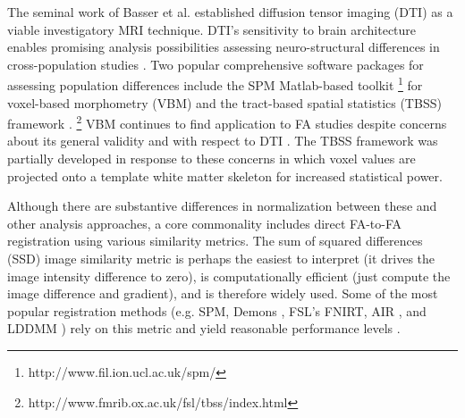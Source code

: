 \documentclass[final,5p,times,twocolumn]{elsarticle}
\begin{document}

The seminal work of Basser et al. \citep{Basser1994a,Basser1994} established diffusion tensor imaging (DTI) as a viable investigatory MRI technique.  DTI's sensitivity to brain architecture \citep{Basser1996,Assaf2008} enables promising analysis possibilities assessing neuro-structural differences in cross-population studies \citep{Kubicki2005,Arnone2008,Kantarci2010,Rametti2010}.
Two popular comprehensive software packages for assessing population differences include the SPM Matlab-based toolkit%
\footnote{
http://www.fil.ion.ucl.ac.uk/spm/
}
for voxel-based morphometry (VBM)
and the tract-based spatial statistics (TBSS) framework \citep{Smith2006}.%
\footnote{
http://www.fmrib.ox.ac.uk/fsl/tbss/index.html
} 
VBM \citep{Ashburner2001} continues to find application to FA studies \citep{Kakeda2010,Takao2010,Preziosa2011} despite concerns about its general validity \citep{Bookstein2001,Davatzikos2004} and with respect to DTI \citep{Jones2005,Chung2008}.  The TBSS framework was partially developed in response to these concerns in which voxel values are projected onto a template white matter skeleton for increased statistical power.  

Although there are substantive differences in normalization
between these and other analysis approaches, a core
commonality includes direct FA-to-FA registration using various similarity metrics.  The sum of squared differences (SSD) image similarity metric is perhaps the easiest to interpret (it drives the image intensity difference to zero), is computationally efficient (just compute the image difference and gradient), and is therefore widely used.  Some of the most popular registration methods (e.g. SPM, 
Demons \cite{Thirion1998}, FSL's FNIRT, AIR \citep{Woods1998}, and LDDMM \citep{Beg2005}) rely on this metric and yield reasonable performance levels \citep{Klein2009}.%
\end{document}
